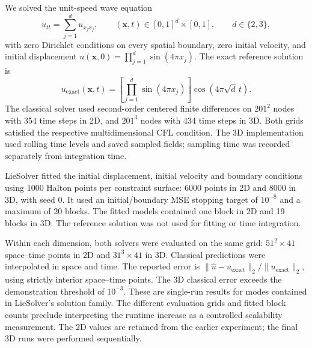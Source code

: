 We solved the unit-speed wave equation
\[
    u_{tt}=\sum_{j=1}^{d}u_{x_jx_j},
    \qquad (\mathbf{x},t)\in[0,1]^d\times[0,1],
    \qquad d\in\{2,3\},
\]
with zero Dirichlet conditions on every spatial boundary, zero initial
velocity, and initial displacement
$u(\mathbf{x},0)=\prod_{j=1}^{d}\sin(4\pi x_j)$.
The exact reference solution is
\[
    u_{\mathrm{exact}}(\mathbf{x},t)
    =\left[\prod_{j=1}^{d}\sin(4\pi x_j)\right]
      \cos(4\pi\sqrt{d}\,t).
\]
The classical solver used second-order centered finite differences on
$201^2$ nodes with 354 time steps in 2D, and $201^3$ nodes with 434 time
steps in 3D. Both grids satisfied the respective multidimensional CFL
condition. The 3D implementation used rolling time levels and saved sampled
fields; sampling time was recorded separately from integration time.

LieSolver fitted the initial displacement, initial velocity and boundary
conditions using 1000 Halton points per constraint surface: 6000 points in
2D and 8000 in 3D, with seed 0. It used an initial/boundary MSE stopping
target of $10^{-8}$ and a maximum of 20 blocks. The fitted models contained
one block in 2D and 19 blocks in 3D. The reference solution was not used
for fitting or time integration.

Within each dimension, both solvers were evaluated on the same grid:
$51^2\times41$ space--time points in 2D and $31^3\times41$ in 3D.
Classical predictions were interpolated in space and time. The reported
error is $\|\hat{u}-u_{\mathrm{exact}}\|_2/\|u_{\mathrm{exact}}\|_2$,
using strictly interior space--time points. The 3D classical error exceeds
the demonstration threshold of $10^{-3}$. These are single-run results
for modes contained in LieSolver's solution family. The different evaluation
grids and fitted block counts preclude interpreting the runtime increase
as a controlled scalability measurement. The 2D values are retained from
the earlier experiment; the final 3D runs were performed sequentially.
